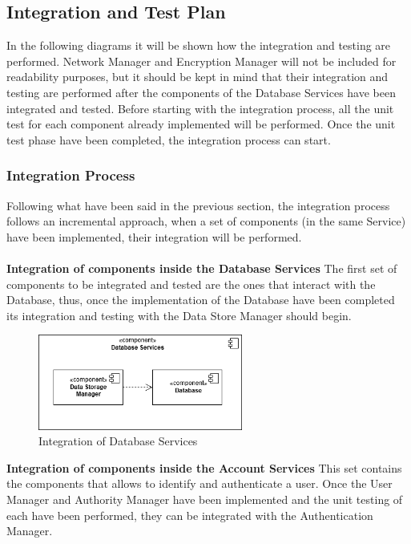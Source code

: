 \subsection{Integration and Test Plan}
In the following diagrams it will be shown how the integration and testing are performed. Network Manager and Encryption Manager will not be included for readability purposes, but it should be kept in mind that their integration and testing are performed after the components of the Database Services have been integrated and tested. Before starting with the integration process, all the unit test for each component already implemented will be performed. Once the unit test phase have been completed, the integration process can start.
\subsubsection{Integration Process}
Following what have been said in the previous section, the integration process follows an incremental approach, when a set of components (in the same Service) have been implemented, their integration will be performed.\\\\
\textbf{Integration of components inside the Database Services }\newline
The first set of components to be integrated and tested are the ones that interact with the Database, thus, once the implementation of the Database have been completed its integration and testing with the Data Store Manager should begin.
     \begin{figure}[H]
     \centering
          \includegraphics[width=0.6\textwidth]{Images/db_services_definitivo.png}
        \caption{Integration of Database Services}
    \end{figure}
            \noindent\textbf{Integration of components inside the Account Services }\newline
This set contains the components that allows to identify and authenticate a user. Once the User Manager and Authority Manager have been implemented and the unit testing of each have been performed, they can be integrated with the Authentication Manager.
